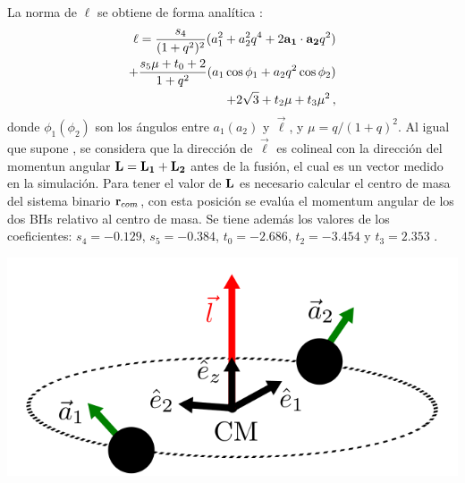 La norma de $\ell$ se obtiene de forma analítica \cite{rezzolla2008}: 
%
\begin{align}
    \ell = \frac{s_{4}}{(1+q^{2})^{2}}(a_{1}^{2}+a_{2}^{2}q^{4}+2{\bf{a_{1}\cdot a_{2}}}q^{2})\\ + \frac{s_{5}\mu + t_{0}+2}{1+q^{2}}(a_{1}\cos\phi_{1}+a_{2}q^{2}\cos\phi_{2})\\ 
    + 2\sqrt{3}+t_{2}\mu+t_{3}\mu^{2}\,,
\end{align}
donde $\phi_{1}(\phi_{2})$ son los ángulos entre $a_{1}(a_{2})$ y $\vec{\ell}$, y $\mu = q/(1+q)^{2}$. Al igual que supone \cite{rezzolla2008}, se considera que la dirección de $\Vec{\ell}$ es colineal con la dirección del momentun angular ${\bf{L=L_{1}+L_{2}}}$ antes de la fusión, el cual es un vector medido en la simulación. Para tener el valor de ${\bf{L}}$ es necesario calcular el centro de masa del sistema binario ${\bf{r}}_{com}$, con esta posición se evalúa el momentum angular de los dos BHs relativo al centro de masa. Se tiene además los valores de los coeficientes: $s_{4}=-0.129$, $s_{5}=-0.384$, $t_{0}=-2.686$, $t_{2}=-3.454$ y $t_{3}=2.353$ \cite{rezzolla2008}.

\begin{center}
\includegraphics[scale=.3]{./figures/4_Modelo_Spin/fusion_BHs.png}
\label{fig: fusion_Bhs}
\end{center}















